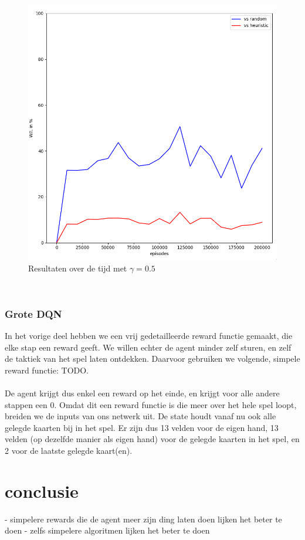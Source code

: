 \documentclass[11pt]{article}
\begin{document}
\begin{figure}[h]
\centering
\includegraphics[scale=0.15]{images/schommelingen-dqn.png}
\caption{Resultaten over de tijd met $\gamma=0.5$}
\end{figure}\\

\subsubsection{Grote DQN}
In het vorige deel hebben we een vrij gedetailleerde reward functie gemaakt, die elke stap een reward geeft. We willen echter de agent minder zelf sturen, en zelf de taktiek van het spel laten ontdekken. Daarvoor gebruiken we volgende, simpele reward functie: TODO.\\\\
De agent krijgt dus enkel een reward op het einde, en krijgt voor alle andere stappen een 0. Omdat dit een reward functie is die meer over het hele spel loopt, breiden we de inputs van ons netwerk uit. De state houdt vanaf nu ook alle gelegde kaarten bij in het spel. Er zijn dus 13 velden voor de eigen hand, 13 velden (op dezelfde manier als eigen hand) voor de gelegde kaarten in het spel, en 2 voor de laatste gelegde kaart(en). 

\section{conclusie}
- simpelere rewards die de agent meer zijn ding laten doen lijken het beter te doen
- zelfs simpelere algoritmen lijken het beter te doen\\\\
\end{document}
